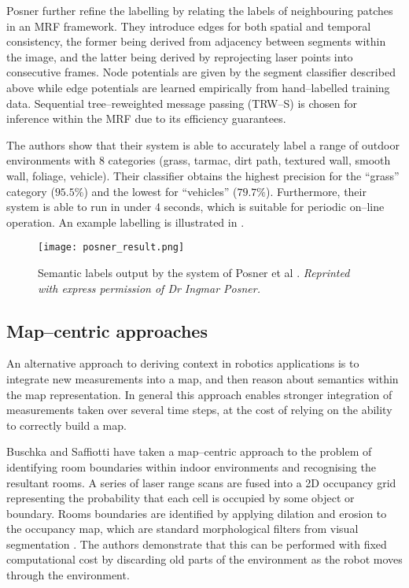 Posner \etal further refine the labelling by relating the labels of
neighbouring patches in an MRF framework. They introduce edges for
both spatial and temporal consistency, the former being derived from
adjacency between segments within the image, and the latter being
derived by reprojecting laser points into consecutive frames. Node
potentials are given by the segment classifier described above
while edge potentials are learned empirically from hand--labelled
training data. Sequential tree--reweighted message passing (TRW--S) is
chosen for inference within the MRF due to its efficiency guarantees.

The authors show that their system is able to accurately label a range
of outdoor environments with 8 categories (grass, tarmac, dirt path,
textured wall, smooth wall, foliage, vehicle). Their classifier
obtains the highest precision for the ``grass'' category ($95.5\%$)
and the lowest for ``vehicles'' ($79.7\%$). Furthermore, their system
is able to run in under 4 seconds, which is suitable for periodic
on--line operation. An example labelling is illustrated in
.

\begin{figure}[tb]
  \centering
  \texttt{[image: posner\_result.png]}
  \caption{Semantic labels output by the system of Posner et al
    \cite{Posner08}.
    \textit{Reprinted with express permission of Dr Ingmar Posner.}
  }
  \label{fig:posner-result}
\end{figure}

\subsection{Map--centric approaches}
An alternative approach to deriving context in robotics applications is
to integrate new measurements into a map, and then reason about
semantics within the map representation. In general this approach
enables stronger integration of measurements taken over several time
steps, at the cost of relying on the ability to correctly build a map.

Buschka and Saffiotti \cite{Buschka02} have taken a map--centric
approach to the problem of identifying room boundaries within indoor
environments and recognising the resultant rooms. A series of laser
range scans are fused into a 2D occupancy grid representing the
probability that each cell is occupied by some object or
boundary. Rooms boundaries are identified by applying dilation and
erosion to the occupancy map, which are standard morphological filters
from visual segmentation \cite{Forsyth02}. The
authors demonstrate that this can be performed with fixed
computational cost by discarding old parts of the environment as the
robot moves through the environment.

